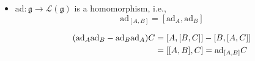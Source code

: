 \begin{itemize}
	\item $\mathrm{ad} : \mathfrak{g} \rightarrow \mathcal{L}(\mathfrak{g})$ is a homomorphism, i.e.,
	\begin{equation}
		\mathrm{ad}_{[A, B]} = [\mathrm{ad}_A, \mathrm{ad}_B]
	\end{equation}
	
	\begin{tcolorbox}[title=proof:]
		\begin{align}
			(\mathrm{ad}_A \mathrm{ad}_B - \mathrm{ad}_B \mathrm{ad}_A) C &= [A, [B, C]] - [B, [A, C]] \notag \\
			&= [[A, B], C] = \mathrm{ad}_{[A, B]} C
		\end{align}
	\end{tcolorbox}
\end{itemize}

